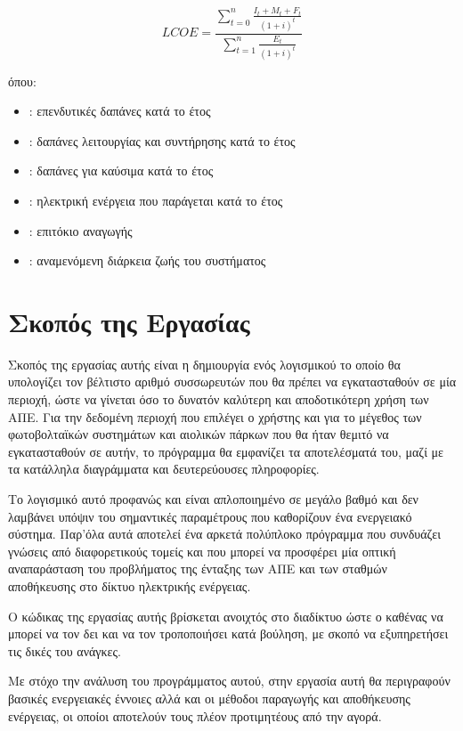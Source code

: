\documentclass[12pt]{report}
\begin{document}
{\large
\begin{equation}
	LCOE = \frac{\sum\limits_{t=0}^{n} \frac{I_{t} + M_{t} + F_{t}}{(1+i)^{t}}}{\sum_{t=1}^{n} \frac{E_{t}}{(1+i)^{t}}}
\label{eq:lcoe}
\end{equation}
}

όπου:
\begin{itemize}
\item[] {} : επενδυτικές δαπάνες κατά το έτος {}
\item[]	{} : δαπάνες λειτουργίας και συντήρησης κατά το έτος {}
\item[] {} : δαπάνες για καύσιμα κατά το έτος {}
\item[]	{} : ηλεκτρική ενέργεια που παράγεται κατά το έτος {}
\item[] {} : επιτόκιο αναγωγής
\item[] {} : αναμενόμενη διάρκεια ζωής του συστήματος
\end{itemize}

\chapter*{Σκοπός της Εργασίας}
Σκοπός της εργασίας αυτής είναι η δημιουργία ενός λογισμικού το οποίο θα υπολογίζει τον βέλτιστο αριθμό συσσωρευτών που θα πρέπει να εγκατασταθούν σε μία περιοχή, ώστε να γίνεται όσο το δυνατόν καλύτερη και 
αποδοτικότερη χρήση των ΑΠΕ. Για την δεδομένη περιοχή που επιλέγει ο χρήστης και για το μέγεθος των φωτοβολταϊκών συστημάτων και αιολικών πάρκων που θα ήταν θεμιτό να εγκατασταθούν σε αυτήν, το πρόγραμμα θα εμφανίζει τα
αποτελέσματά του, μαζί με τα κατάλληλα διαγράμματα και δευτερεύουσες πληροφορίες.

Το λογισμικό αυτό προφανώς και είναι απλοποιημένο σε μεγάλο βαθμό και δεν λαμβάνει υπόψιν του σημαντικές παραμέτρους που καθορίζουν ένα ενεργειακό σύστημα. Παρ'όλα αυτά αποτελεί ένα αρκετά πολύπλοκο πρόγραμμα που συνδυάζει γνώσεις
από διαφορετικούς τομείς και που μπορεί να προσφέρει μία οπτική αναπαράσταση του προβλήματος της ένταξης των ΑΠΕ και των σταθμών αποθήκευσης στο δίκτυο ηλεκτρικής ενέργειας.

Ο κώδικας της εργασίας αυτής βρίσκεται ανοιχτός στο διαδίκτυο ώστε ο καθένας να μπορεί να τον δει και να τον τροποποιήσει κατά βούληση, με σκοπό να εξυπηρετήσει 
τις δικές του ανάγκες.

Με στόχο την ανάλυση του προγράμματος αυτού, στην εργασία αυτή θα περιγραφούν βασικές ενεργειακές έννοιες αλλά και οι μέθοδοι παραγωγής και αποθήκευσης ενέργειας, οι οποίοι αποτελούν τους πλέον προτιμητέους από την αγορά. 
\end{document}
